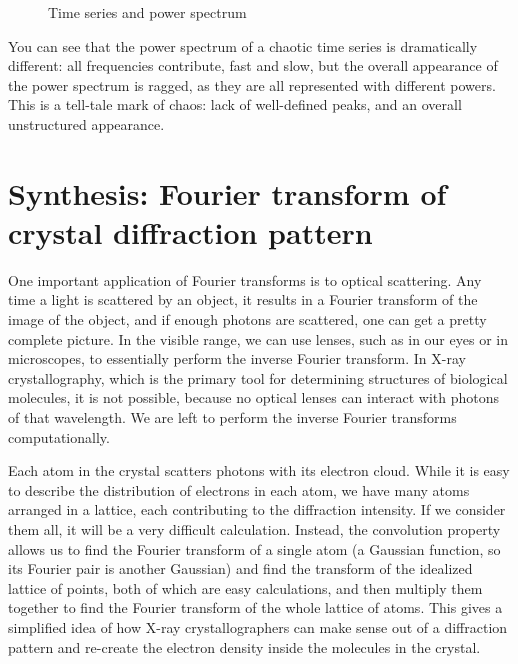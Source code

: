 \documentclass[
  letterpaper,
  DIV=11,
  numbers=noendperiod]{scrreprt}
\begin{document}
\begin{figure}
\begin{minipage}{0.50\linewidth}
{}


\end{minipage}%

\caption{\label{fig-log-map-38}Time series and power spectrum}

\end{figure}%

You can see that the power spectrum of a chaotic time series is
dramatically different: all frequencies contribute, fast and slow, but
the overall appearance of the power spectrum is ragged, as they are all
represented with different powers. This is a tell-tale mark of chaos:
lack of well-defined peaks, and an overall unstructured appearance.

\section{Synthesis: Fourier transform of crystal diffraction
pattern}\label{synthesis-fourier-transform-of-crystal-diffraction-pattern}

One important application of Fourier transforms is to optical
scattering. Any time a light is scattered by an object, it results in a
Fourier transform of the image of the object, and if enough photons are
scattered, one can get a pretty complete picture. In the visible range,
we can use lenses, such as in our eyes or in microscopes, to essentially
perform the inverse Fourier transform. In X-ray crystallography, which
is the primary tool for determining structures of biological molecules,
it is not possible, because no optical lenses can interact with photons
of that wavelength. We are left to perform the inverse Fourier
transforms computationally.

Each atom in the crystal scatters photons with its electron cloud. While
it is easy to describe the distribution of electrons in each atom, we
have many atoms arranged in a lattice, each contributing to the
diffraction intensity. If we consider them all, it will be a very
difficult calculation. Instead, the convolution property allows us to
find the Fourier transform of a single atom (a Gaussian function, so its
Fourier pair is another Gaussian) and find the transform of the
idealized lattice of points, both of which are easy calculations, and
then multiply them together to find the Fourier transform of the whole
lattice of atoms. This gives a simplified idea of how X-ray
crystallographers can make sense out of a diffraction pattern and
re-create the electron density inside the molecules in the crystal.
\end{document}
